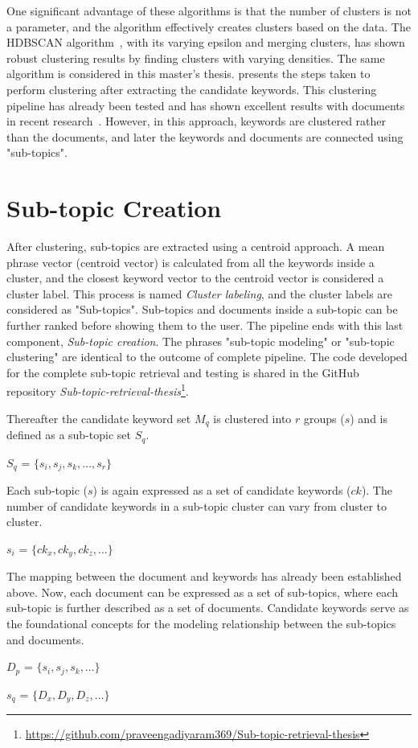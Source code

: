 One significant advantage of these algorithms is that the number of clusters is not a parameter, and the algorithm effectively creates clusters based on the data. The \ac{HDBSCAN} algorithm~\cite{mcinnes2017hdbscan}, with its varying epsilon and merging clusters, has shown robust clustering results by finding clusters with varying densities. The same algorithm is considered in this master's thesis.  presents the steps taken to perform clustering after extracting the candidate keywords. This clustering pipeline has already been tested and has shown excellent results with documents in recent research~\cite{angelov2020top2vec}. However, in this approach, keywords are clustered rather than the documents, and later the keywords and documents are connected using "sub-topics".




\section{Sub-topic Creation} 

After clustering, sub-topics are extracted using a centroid approach. A mean phrase vector (centroid vector) is calculated from all the keywords inside a cluster, and the closest keyword vector to the centroid vector is considered a cluster label. This process is named \textit{Cluster labeling}, and the cluster labels are considered as "Sub-topics". Sub-topics and documents inside a sub-topic can be further ranked before showing them to the user. The pipeline ends with this last component, \emph{Sub-topic creation}.  The phrases "sub-topic modeling" or "sub-topic clustering" are identical to the outcome of complete pipeline. The code developed for the complete sub-topic retrieval and testing is shared in the GitHub repository \textit{Sub-topic-retrieval-thesis}\footnote{\url{https://github.com/praveengadiyaram369/Sub-topic-retrieval-thesis}}.


Thereafter the candidate keyword set $M_q$ is clustered into $r$ groups ($s$) and is defined as a sub-topic set $S_q$. 

\centerline{$S_q$ = $\{s_i, s_j, s_k,\dots, s_r\}$}

Each sub-topic ($s$) is again expressed as a set of candidate keywords  ($ck$). The number of candidate keywords in a sub-topic cluster can vary from cluster to cluster.

\centerline{$s_i$ = $\{ck_x, ck_y, ck_z,\dots\}$}

The mapping between the document and keywords has already been established above. Now, each document can be expressed as a set of sub-topics, where each sub-topic is further described as a set of documents. Candidate keywords serve as the foundational concepts for the modeling relationship between the sub-topics and documents.

\centerline{$D_p$ = $\{s_i, s_j, s_k,\dots\}$ }
\centerline{$s_q$ = $\{D_x, D_y, D_z,\dots\}$}


